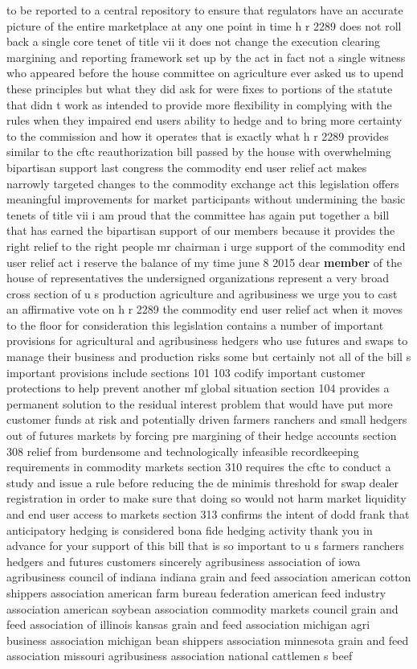 \documentclass{article}
\begin{document}
to be reported to a central repository to ensure that regulators have an accurate picture of the entire marketplace at any one point in time h r 2289 does not roll back a single core tenet of title vii it does not change the execution clearing margining and reporting framework set up by the act in fact not a single witness who appeared before the house committee on agriculture ever asked us to upend these principles but what they did ask for were fixes to portions of the statute that didn t work as intended to provide more flexibility in complying with the rules when they impaired end users ability to hedge and to bring more certainty to the commission and how it operates that is exactly what h r 2289 provides similar to the cftc reauthorization bill passed by the house with overwhelming bipartisan support last congress the commodity end user relief act makes narrowly targeted changes to the commodity exchange act this legislation offers meaningful improvements for market participants without undermining the basic tenets of title vii i am proud that the committee has again put together a bill that has earned the bipartisan support of our members because it provides the right relief to the right people mr chairman i urge support of the commodity end user relief act i reserve the balance of my time june 8 2015 dear {\bf \color{red} member} of the house of representatives the undersigned organizations represent a very broad cross section of u s production agriculture and agribusiness we urge you to cast an affirmative vote on h r 2289 the commodity end user relief act when it moves to the floor for consideration this legislation contains a number of important provisions for agricultural and agribusiness hedgers who use futures and swaps to manage their business and production risks some but certainly not all of the bill s important provisions include sections 101 103 codify important customer protections to help prevent another mf global situation section 104 provides a permanent solution to the residual interest problem that would have put more customer funds at risk and potentially driven farmers ranchers and small hedgers out of futures markets by forcing pre margining of their hedge accounts section 308 relief from burdensome and technologically infeasible recordkeeping requirements in commodity markets section 310 requires the cftc to conduct a study and issue a rule before reducing the de minimis threshold for swap dealer registration in order to make sure that doing so would not harm market liquidity and end user access to markets section 313 confirms the intent of dodd frank that anticipatory hedging is considered bona fide hedging activity thank you in advance for your support of this bill that is so important to u s farmers ranchers hedgers and futures customers sincerely agribusiness association of iowa agribusiness council of indiana indiana grain and feed association american cotton shippers association american farm bureau federation american feed industry association american soybean association commodity markets council grain and feed association of illinois kansas grain and feed association michigan agri business association michigan bean shippers association minnesota grain and feed association missouri agribusiness association national cattlemen s beef 
\end{document}
